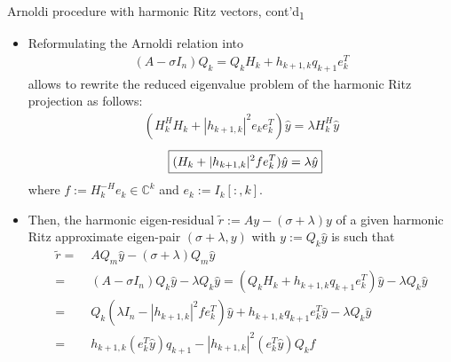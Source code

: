 \documentclass[t,usepdftitle=false]{beamer}
\begin{document}
\begin{frame}{Arnoldi procedure with harmonic Ritz vectors, cont'd\textsubscript{1}}
\begin{itemize}
\item Reformulating the Arnoldi relation into 
\begin{align*}
(A-\sigma I_n)Q_k=Q_{k}H_k+h_{k+1,k}q_{k+1}e_k^T
\end{align*}
allows to rewrite the reduced eigenvalue problem of the harmonic Ritz projection as follows:
\begin{align*}
(H_k^HH_k+|h_{k+1,k}|^2e_ke_k^T)\hat{y}=\lambda H_k^H\hat{y}
\end{align*}
\vspace{-.65cm}
\begin{align*}
\hspace{.23cm}\boxed{(H_k+|h_{k+1,k}|^2fe_k^T)\hat{y}=\lambda\hat{y}}
\end{align*}
where $f:=H_k^{-H}e_k\in\mathbb{C}^{k}$ and $e_k:=I_k[:,k]$.
\item Then, the harmonic eigen-residual $\tilde{r}:=Ay-(\sigma+\lambda )y$ of a given harmonic Ritz approximate eigen-pair $(\sigma+\lambda,y)$ with $y:=Q_k\hat{y}$ is such that
\vspace{-.1cm}
\begin{align*}
\tilde{r}=&\;AQ_m\hat{y}-(\sigma+\lambda)Q_m\hat{y}\\
=&\;(A-\sigma I_n)Q_k\hat{y}-\lambda Q_k\hat{y}=(Q_{k}H_k+h_{k+1,k}q_{k+1}e_k^T)\hat{y}-\lambda Q_k\hat{y}\\
=&\;Q_k(\lambda I_n-|h_{k+1,k}|^2fe_k^T)\hat{y}+h_{k+1,k}q_{k+1}e_k^T\hat{y}-\lambda Q_k\hat{y}\\
=&\;h_{k+1,k}(e_k^T\hat{y})q_{k+1}-|h_{k+1,k}|^2(e_k^T\hat{y})Q_kf
\end{align*}
\end{itemize}
\end{frame}
\end{document}
